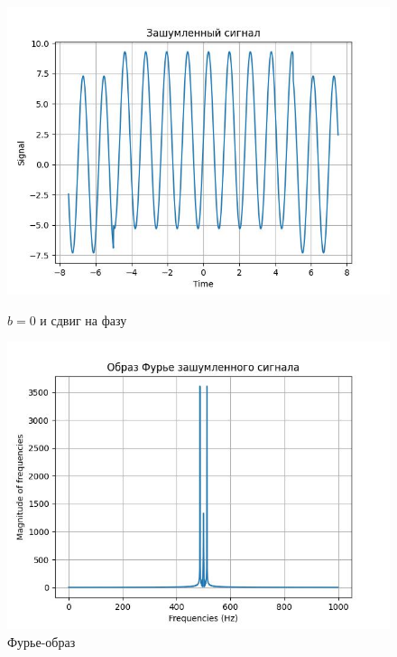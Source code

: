         \begin{figure}[!htb]
            \includegraphics[width=\linewidth]{../images/result/orginal4.jpeg}
            \caption{$b = 0$ и сдвиг на фазу}
          \endminipage\hfill
            \includegraphics[width=\linewidth]{../images/result/original4_fourier.jpeg}
            \caption{Фурье-образ}
          \endminipage\hfill
          \end{figure}
